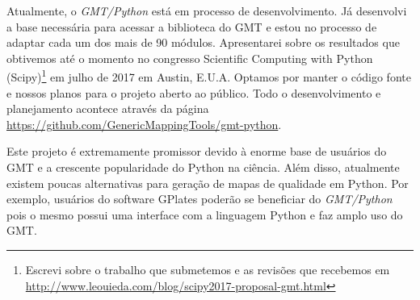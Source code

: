Atualmente, o \textit{GMT/Python} está em processo de desenvolvimento.
Já desenvolvi a base necessária para acessar a biblioteca do GMT
e estou no processo de adaptar cada um dos mais de 90 módulos.
Apresentarei sobre os resultados que obtivemos até o momento no congresso
Scientific Computing with Python (Scipy)\footnote{Escrevi sobre o trabalho que
submetemos e as revisões que recebemos em
\url{http://www.leouieda.com/blog/scipy2017-proposal-gmt.html}} em julho de 2017 em Austin, E.U.A.
Optamos por manter o código fonte e nossos planos para o projeto aberto ao
público.
Todo o desenvolvimento e planejamento acontece através da página
\url{https://github.com/GenericMappingTools/gmt-python}.

Este projeto é extremamente promissor devido à enorme base de usuários do GMT
e a crescente popularidade do Python na ciência.
Além disso, atualmente existem poucas alternativas para geração de mapas de
qualidade em Python.
Por exemplo, usuários do software GPlates \citep{gplates} poderão se beneficiar
do \textit{GMT/Python} pois o mesmo possui uma interface com a linguagem Python
e faz amplo uso do GMT.
